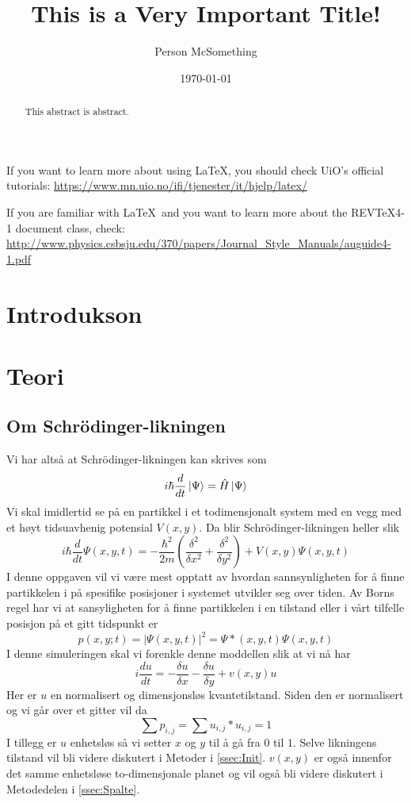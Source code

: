 \documentclass[reprint,english,notitlepage]{revtex4-2}  %
\begin{document}
\title{This is a Very Important Title!}   %
\author{Person McSomething}               %
\date{\today}                             %
\noaffiliation                            %
\begin{abstract}                          %
This abstract is abstract.                %
\end{abstract}                            %
\maketitle                                %

If you want to learn more about using \LaTeX, you should check UiO's official tutorials:
\url{https://www.mn.uio.no/ifi/tjenester/it/hjelp/latex/}

If you are familiar with \LaTeX\ and you want to learn more about the REVTeX4-1 document class, check:
\url{http://www.physics.csbsju.edu/370/papers/Journal_Style_Manuals/auguide4-1.pdf}


\section{Introdukson}

\section{Teori}   %

\subsection{Om Schrödinger-likningen}
Vi har altså at Schrödinger-likningen kan skrives som
$$
i\hbar\frac{d}{dt}\ket{\Psi}=\hat{H}\ket{\Psi}
$$
Vi skal imidlertid se på en partikkel i et todimensjonalt system med en vegg med et høyt tidsuavhenig potensial $V(x,y)$. Da blir Schrödinger-likningen heller slik
$$
i\hbar \frac{d}{dt}\Psi(x,y,t)=-\frac{\hbar^2}{2m}(\frac{\delta^2}{\delta x^2}+\frac{\delta^2}{\delta y^2})+V(x,y)\Psi(x,y,t)
$$
I denne oppgaven vil vi være mest opptatt av hvordan sannsynligheten for å finne partikkelen i på spesifike posisjoner i systemet utvikler seg over tiden. Av Borns regel har vi at sansyligheten for å finne partikkelen i en tilstand eller i vårt tilfelle posisjon på et gitt tidspunkt er
$$
p(x,y;t)=|\Psi(x,y,t)|^2=\Psi*(x,y,t)\Psi(x,y,t)
$$
I denne simuleringen skal vi forenkle denne moddellen slik at vi nå har
$$
i\frac{d u}{dt}=-\frac{\delta u}{\delta x}-\frac{\delta u}{\delta y}+v(x,y)u
$$
Her er $u$ en normalisert og dimensjonsløs kvantetilstand. Siden den er normalisert og vi går over et gitter vil da
$$
\sum p_{i,j}=\sum u_{i,j}*u_{i,j}=1
$$
I tillegg er $u$ enhetsløs så vi setter $x$ og $y$ til å gå fra $0$ til $1$. Selve likningens tilstand vil bli videre diskutert i Metoder i \autoref{ssec:Init}. $v(x,y)$ er også innenfor det samme enhetsløse to-dimensjonale planet og vil også bli videre diskutert i Metodedelen i \autoref{ssec:Spalte}.
\end{document}
